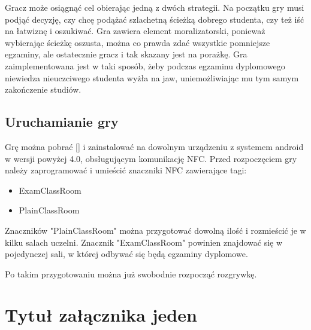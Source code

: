 \documentclass	{xmgr}
\begin{document}
Gracz może osiągnąć cel obierając jedną z dwóch strategii. Na początku gry musi podjąć decyzję, czy chcę podążać szlachetną ścieżką dobrego studenta, czy też iść na łatwiznę i oszukiwać. Gra zawiera element moralizatorski, ponieważ wybierając ścieżkę oszusta, można co prawda zdać wszystkie pomniejsze egzaminy, ale ostatecznie gracz i tak skazany jest na porażkę. Gra zaimplementowana jest w taki sposób, żeby podczas egzaminu dyplomowego niewiedza nieuczciwego studenta wyżła na jaw, uniemożliwiając mu tym samym zakończenie studiów.

\section{Uruchamianie gry}

Grę można pobrać [] i zainstalować na dowolnym urządzeniu z systemem android w wersji powyżej 4.0, obsługującym komunikację NFC. Przed rozpoczęciem gry należy zaprogramować i umieścić znaczniki NFC zawierające tagi:
\begin{itemize}
	\item ExamClassRoom
	\item PlainClassRoom
\end{itemize}
Znaczników "PlainClassRoom" można przygotować dowolną ilość i rozmieścić je w kilku salach uczelni. Znacznik "ExamClassRoom" powinien znajdować się w pojedynczej sali, w której odbywać się będą egzaminy dyplomowe.

Po takim przygotowaniu można już swobodnie rozpocząć rozgrywkę.

\appendix
\chapter{Tytuł załącznika jeden}
\end{document}
